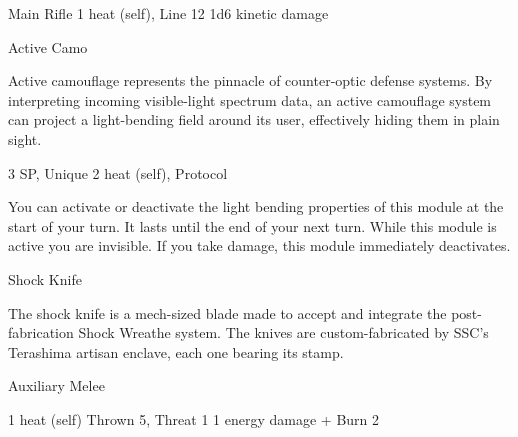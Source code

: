 \begin{mech}
Main Rifle
1 heat (self), Line 12
1d6 kinetic damage


Active Camo

Active camouflage represents the pinnacle of counter-optic defense systems. By interpreting incoming visible-light spectrum data, an active camouflage system can project a light-bending field around its user, effectively hiding them in plain sight.

3 SP, Unique
2 heat (self), Protocol

You can activate or deactivate the light bending properties of this module at the start of your turn. It lasts until the end of your next turn. While this module is active you are invisible. If you take damage, this module immediately deactivates.


Shock Knife

The shock knife is a mech-sized blade made to accept and integrate the post-fabrication Shock Wreathe system. The knives are custom-fabricated by SSC’s Terashima artisan enclave, each one bearing its stamp.

Auxiliary Melee

1 heat (self)
Thrown 5, Threat 1
1 energy damage + Burn 2
\end{mech}
